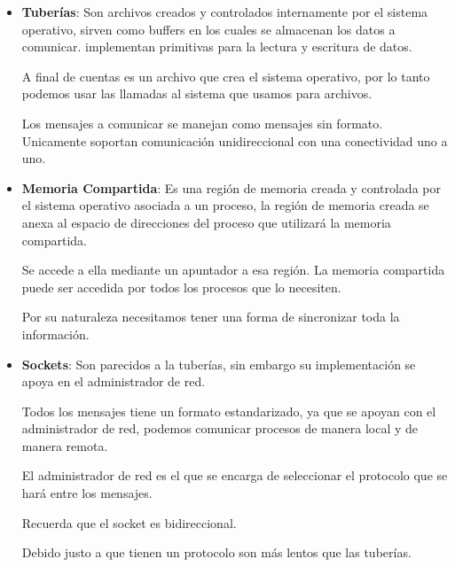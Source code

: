 \documentclass[12pt, fleqn]{report}                             %
\begin{document}
                \begin{itemize}
                    \item \textbf{Tuberías}: Son archivos creados y controlados internamente por el 
                        sistema operativo, sirven como buffers en los cuales se almacenan los datos
                        a comunicar. implementan primitivas para la lectura y escritura de datos.

                        A final de cuentas es un archivo que crea el sistema operativo, por lo tanto
                        podemos usar las llamadas al sistema que usamos para archivos.

                        Los mensajes a comunicar se manejan como mensajes sin formato. Unicamente soportan
                        comunicación unidireccional con una conectividad uno a uno.

                    \item \textbf{Memoria Compartida}:
                        Es una región de memoria creada y controlada por el sistema operativo asociada a un
                        proceso, la región de memoria creada se anexa al espacio de direcciones del proceso
                        que utilizará la memoria compartida.

                        Se accede a ella mediante un apuntador a esa región. La memoria compartida puede ser
                        accedida por todos los procesos que lo necesiten.

                        Por su naturaleza necesitamos tener una forma de sincronizar toda la información.

                    \item \textbf{Sockets}:
                        Son parecidos a la tuberías, sin embargo su implementación se apoya en el administrador
                        de red.

                        Todos los mensajes tiene un formato estandarizado, ya que se apoyan con el administrador
                        de red, podemos comunicar procesos de manera local y de manera remota.

                        El administrador de red es el que se encarga de seleccionar el protocolo que se hará entre
                        los mensajes.

                        Recuerda que el socket es bidireccional.

                        Debido justo a que tienen un protocolo son más lentos que las tuberías.
                \end{itemize}
\end{document}
